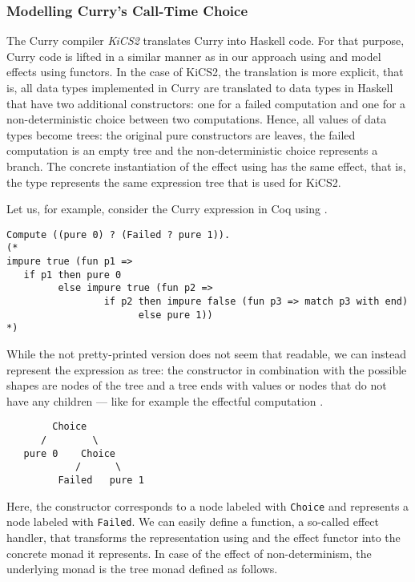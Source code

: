 \subsubsection{Modelling Curry's Call-Time Choice}

The Curry compiler \emph{KiCS2} translates Curry into Haskell code.
For that purpose, Curry code is lifted in a similar manner as in our approach using  and model effects using functors.
In the case of KiCS2, the translation is more explicit, that is, all data types implemented in Curry are translated to data types in Haskell that have two additional constructors: one for a failed computation and one for a non-deterministic choice between two computations.
Hence, all values of data types become trees: the original pure constructors are leaves, the failed computation is an empty tree and the non-deterministic choice represents a branch.
The concrete instantiation of the effect using  has the same effect, that is, the type  represents the same expression tree that is used for KiCS2.

Let us, for example, consider the Curry expression  in Coq using .

\begin{verbatim}
Compute ((pure 0) ? (Failed ? pure 1)).
(*
impure true (fun p1 =>
   if p1 then pure 0
         else impure true (fun p2 =>
                 if p2 then impure false (fun p3 => match p3 with end)
                       else pure 1))
*)
\end{verbatim}

While the not pretty-printed version does not seem that readable, we can instead represent the expression as tree: the constructor  in combination with the possible shapes are nodes of the tree and a tree ends with  values or nodes that do not have any children --- like for example the effectful computation .

\begin{verbatim}
        Choice
      /        \
   pure 0    Choice
            /      \
         Failed   pure 1
\end{verbatim}

Here, the constructor  corresponds to a node labeled with \texttt{Choice} and  represents a node labeled with \texttt{Failed}.
We can easily define a function, a so-called effect handler, that transforms the representation using  and the effect functor into the concrete monad it represents.
In case of the effect of non-determinism, the underlying monad is the tree monad defined as follows.

